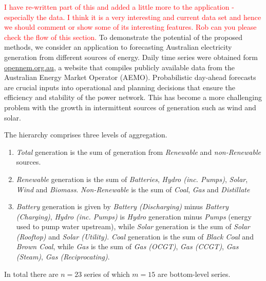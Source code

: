 \documentclass[11pt]{article}
\theoremstyle{definition}
\begin{document}
\textcolor{red}{I have re-written part of this and added a little more to the application - especially the data. I think it is a very interesting and current data set and hence we should comment or show some of its interesting features. Rob can you please check the flow of this section.}
To demonstrate the potential of the proposed methods, we consider an application to forecasting Australian electricity generation from different sources of energy. Daily time series were obtained form \url{opennem.org.au}, a website that compiles publicly available data from the Australian Energy Market Operator (AEMO). Probabilistic day-ahead forecasts are crucial inputs into operational and planning decisions that ensure the efficiency and stability of the power network. This has become a more challenging problem with the growth in intermittent sources of generation such as wind and solar.

The hierarchy comprises three levels of aggregation.
\begin{enumerate}
  \item \textit{Total} generation is the sum of generation from \textit{Renewable} and \textit{non-Renewable} sources.
  \item \textit{Renewable} generation is the sum of \textit{Batteries}, \textit{Hydro (inc. Pumps)}, \textit{Solar}, \textit{Wind} and \textit{Biomass}. \textit{Non-Renewable} is the sum of \textit{Coal}, \textit{Gas} and \textit{Distillate}
  \item \textit{Battery} generation is given by \textit{Battery (Discharging)} minus \textit{Battery (Charging)}, \textit{Hydro (inc. Pumps)} is \textit{Hydro} generation minus \textit{Pumps} (energy used to pump water upstream), while \textit{Solar} generation is the sum of \textit{Solar (Rooftop)} and \textit{Solar (Utility)}. \textit{Coal} generation is the sum of \textit{Black Coal} and \textit{Brown Coal}, while \textit{Gas} is the sum of \textit{Gas (OCGT)}, \textit{Gas (CCGT)}, \textit{Gas (Steam)}, \textit{Gas (Reciprocating)}.
\end{enumerate}
In total there are $n=23$ series of which $m=15$ are bottom-level series.

\end{document}
